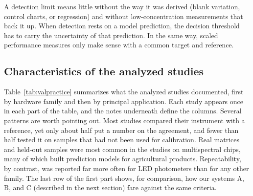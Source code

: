 A detection limit means little without the way it was derived (blank variation, control charts, or regression) and without low-concentration measurements that back it up.\citep{silva2022smartphone,prairie2020accurate,konnel2025low} When detection rests on a model prediction, the decision threshold has to carry the uncertainty of that prediction.\citep{suhendar2025webcam} In the same way, scaled performance measures only make sense with a common target and reference.\citep{martinezavino2021scaling}

\subsection{Characteristics of the analyzed studies}

Table~\ref{tab:valpractice} summarizes what the analyzed studies documented, first by hardware family and then by principal application. Each study appears once in each part of the table, and the notes underneath define the columns. Several patterns are worth pointing out. Most studies compared their instrument with a reference, yet only about half put a number on the agreement, and fewer than half tested it on samples that had not been used for calibration. Real matrices and held-out samples were most common in the studies on multispectral chips, many of which built prediction models for agricultural products. Repeatability, by contrast, was reported far more often for LED photometers than for any other family. The last row of the first part shows, for comparison, how our systems A, B, and C (described in the next section) fare against the same criteria.

